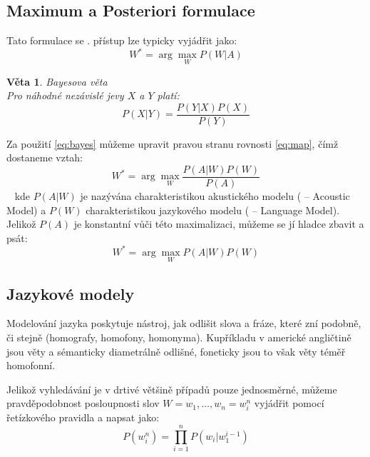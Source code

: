 \subsection{Maximum a Posteriori formulace}

Tato formulace se  \cite{jelinek_2010}.  přístup \cite{bahl_jelinek_1983} lze typicky vyjádřit jako:
%
\begin{equation}
	\label{eq:map}
	W^* = \arg \max_{W} P(W|A)
\end{equation}

\newtheorem{t:bayes}{Věta}
\begin{t:bayes}
Bayesova věta \\
Pro náhodné nezávislé jevy $X$ a $Y$ platí:
\begin{equation}
	\label{eq:bayes}
	P(X|Y) = \frac{P(Y|X) P(X)}{P(Y)}
\end{equation}
\end{t:bayes}

Za použití \ref{eq:bayes} můžeme upravit pravou stranu rovnosti \ref{eq:map}, čímž dostaneme vztah:
%
\begin{equation}
	\label{eq:map2}
	W^* = \arg \max_{W} \frac{P(A|W) P(W)}{P(A)}
\end{equation}\
%
kde $P(A|W)$ je nazývána charakteristikou akustického modelu ( -- Acoustic Model) a $P(W)$ charakteristikou jazykového modelu ( -- Language Model). Jelikož $P(A)$ je konstantní vůči této maximalizaci, můžeme se jí hladce zbavit a psát:
%
\begin{equation}
	\label{eq:map3}
	W^* = \arg \max_{W} P(A|W) P(W)
\end{equation}

\subsection{Jazykové modely}

Modelování jazyka poskytuje nástroj, jak odlišit slova a fráze, které zní podobně, či stejně (homografy, homofony, homonyma). Kupříkladu v americké angličtině jsou věty  a  sémanticky diametrálně odlišné, foneticky jsou to však věty téměř homofonní. 

Jelikož vyhledávání je v drtivé většině případů pouze jednosměrné, můžeme pravděpodobnost posloupnosti slov $W = w_1, \dots, w_n = w^n_i$ vyjádřit pomocí řetízkového pravidla a napsat jako:
%
\begin{equation}
	\label{eq:lm}
	P(w^n_i) = \prod\limits_{i=1}^n P(w_i|w^{i-1}_1)
\end{equation}


